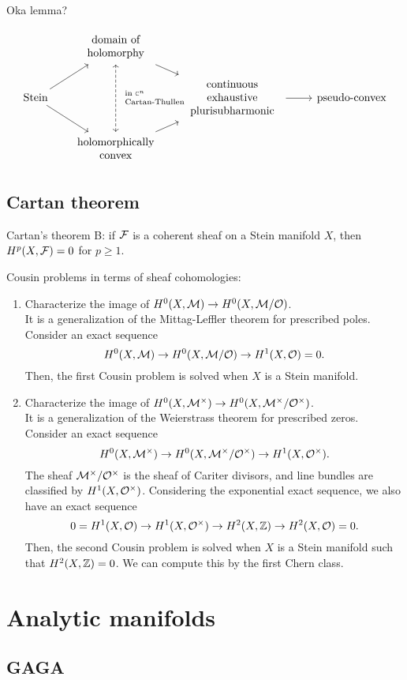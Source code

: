 \documentclass{../../large}
\begin{document}
\begin{prb}
\end{prb}

Oka lemma?

\[\begin{tikzcd}[sep=small]
& \tab{domain of\\holomorphy} \ar{dr}\ar[<->, dashed]{dd}{\scriptsize\tab[l]{in $\C^n$\\Cartan-Thullen}} &&&\\
\text{Stein} \ar{ur}\ar{dr} && \tab{continuous\\exhaustive\\plurisubharmonic} \ar{rr} && \text{pseudo-convex} \\
& \tab{holomorphically\\convex} \ar{ur} &&&
\end{tikzcd}\]


\section{Cartan theorem}

Cartan's theorem B: if $\mathcal{F}$ is a coherent sheaf on a Stein manifold $X$, then $H^p(X,\mathcal{F})=0$ for $p\ge1$.

Cousin problems in terms of sheaf cohomologies:
\begin{enumerate}
\item Characterize the image of $H^0(X,\mathcal{M})\to H^0(X,\mathcal{M}/\mathcal{O})$.\\
It is a generalization of the Mittag-Leffler theorem for prescribed poles.
Consider an exact sequence
\[H^0(X,\mathcal{M})\to H^0(X,\mathcal{M}/\mathcal{O})\to H^1(X,\mathcal{O})=0.\]
Then, the first Cousin problem is solved when $X$ is a Stein manifold.
\item Characterize the image of $H^0(X,\mathcal{M}^\times)\to H^0(X,\mathcal{M}^\times/\mathcal{O}^\times)$.\\
It is a generalization of the Weierstrass theorem for prescribed zeros.
Consider an exact sequence
\[H^0(X,\mathcal{M}^\times)\to H^0(X,\mathcal{M}^\times/\mathcal{O}^\times)\to H^1(X,\mathcal{O}^\times).\]
The sheaf $\mathcal{M}^\times/\mathcal{O}^\times$ is the sheaf of Cariter divisors, and line bundles are classified by $H^1(X,\mathcal{O}^\times)$.
Considering the exponential exact sequence, we also have an exact sequence
\[0=H^1(X,\mathcal{O})\to H^1(X,\mathcal{O}^\times)\to H^2(X,\mathbb{Z})\to H^2(X,\mathcal{O})=0.\]
Then, the second Cousin problem is solved when $X$ is a Stein manifold such that $H^2(X,\mathbb{Z})=0$.
We can compute this by the first Chern class.
\end{enumerate}

\chapter{Analytic manifolds}

\section{GAGA}
\end{document}
